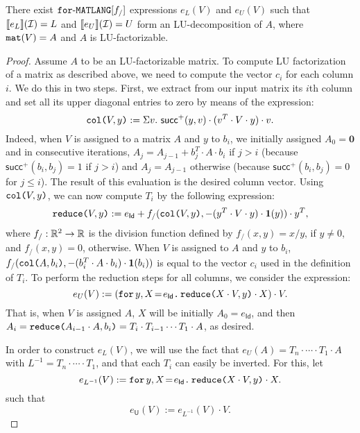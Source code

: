 \begin{proposition}\label{prop:gauss}
There exist $\langforf{f_/}$ expressions $e_L(V)$ and $e_U(V)$ such that
$\sem{e_L}{\I}=L$ and $\sem{e_U}{\I}=U$ form an LU-decomposition of $A$,
where $\conc(V)=A$ and $A$ is LU-factorizable.
\end{proposition}
\begin{proof}
Assume $A$ to be an LU-factorizable matrix. To compute LU factorization of a matrix as described above, we need to compute the vector $c_i$ for each column $i$. We do this in two steps. First, we extract from our input matrix its $i$th column and set all its upper diagonal entries to zero
by means of 
 the 
 expression:
$$\ccol{V}{y} := \Sigma v. \  \mathsf{succ}^+(y,v)\cdot(v^T\cdot V \cdot y)\cdot v.$$
Indeed, when $V$ is assigned to a matrix $A$ and $y$ to $b_i$, we initially assigned
$A_0=\mathbf{0}$ and in consecutive iterations,  $A_j=A_{j-1}+ b_j^T\cdot A\cdot b_i$ if $j>i$ (because $\mathsf{succ}^+(b_i,b_j)=1$ if $j>i$) and $A_j=A_{j-1}$ otherwise (because $\mathsf{succ}^+(b_i,b_j)=0$ for $j\leq i$). The result of this evaluation is the desired column vector.
Using $\ccol{V}{y}$, we can now compute $T_i$ by the following expression:
$$\red{V}{y} := e_{\mathsf{Id}}+ f_/(\ccol{V}{y},-(y^T\cdot V\cdot y)\cdot \ones(y))\cdot y^T,$$
where $f_/:\RR^2\to\RR$ is the division function defined by
$f_/(x,y)=x/y$, if $y\neq 0$, and $f_/(x,y)=0$, otherwise. 
When $V$ is assigned to $A$ and $y$ to $b_i$, $f_/(\ccol{A}{b_i},-(b_i^T\cdot A\cdot b_i)\cdot \ones(b_i))$ is equal to the vector $c_i$ used in the definition of $T_i$. To perform the reduction steps for all columns, we consider
the expression:
$$
e_{U}(V) :=  \left( \initf{e_{\mathsf{Id}}}{y}{X}{\red{X\cdot V}{y}\cdot X} \right) \cdot V.
$$
That is, when $V$ is assigned $A$, $X$ will be initially $A_0=e_{\mathsf{Id}}$, and then
$A_i=\red{A_{i-1}\cdot A}{b_i}=T_i\cdot T_{i-1}\cdots T_1\cdot A$, as desired.

In order to construct $e_L(V)$, we will use the fact that $e_U(A)=T_n\cdot\cdots\cdot T_1\cdot A$ with $L^{-1}=T_n\cdot\cdots\cdot T_1$, and that each $T_i$ can easily be inverted. For this, let
    $$
    e_{L^{-1}}(V) :=  \initf{e_{\mathsf{Id}}}{y}{X}{\red{X\cdot V}{y}\cdot X}.
    $$
    such that	$$
        e_{\mathsf{U}}(V) :=  e_{L^{-1}}(V) \cdot V.
        $$


\end{proof}
